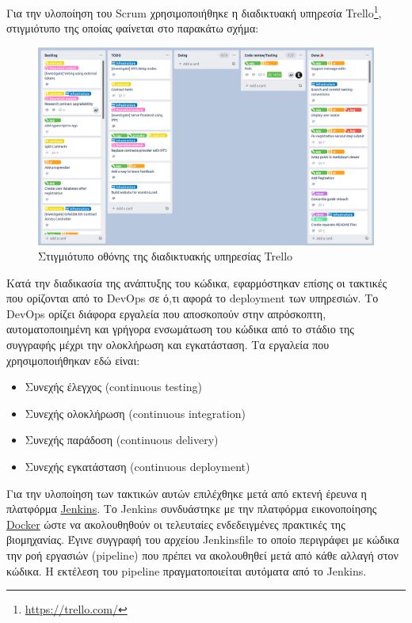 Για την υλοποίηση του Scrum χρησιμοποιήθηκε η διαδικτυακή υπηρεσία Trello\footnote{\url{https://trello.com/}}, στιγμιότυπο της οποίας φαίνεται στο παρακάτω σχήμα:

\begin{figure}[H]
    \centering
    \includegraphics[width=\textwidth]{assets/figures/chapter-4/4.1.implementation-methodology-kanban.png}
    \caption{Στιγμιότυπο οθόνης της διαδικτυακής υπηρεσίας Trello}
    \label{figure:4.1.implementation-methodology-kanban}
\end{figure}

Κατά την διαδικασία της ανάπτυξης του κώδικα, εφαρμόστηκαν επίσης οι τακτικές που ορίζονται από το DevOps σε ό,τι αφορά το deployment των υπηρεσιών. Το DevOps ορίζει διάφορα εργαλεία που αποσκοπούν στην απρόσκοπτη, αυτοματοποιημένη και γρήγορα ενσωμάτωση του κώδικα από το στάδιο της συγγραφής μέχρι την ολοκλήρωση και εγκατάσταση. Τα εργαλεία που χρησιμοποιήθηκαν εδώ είναι:

\begin{itemize}
    \item Συνεχής έλεγχος (continuous testing)
    \item Συνεχής ολοκλήρωση (continuous integration)
    \item Συνεχής παράδοση (continuous delivery)
    \item Συνεχής εγκατάσταση (continuous deployment)
\end{itemize}

Για την υλοποίηση των τακτικών αυτών επιλέχθηκε μετά από εκτενή έρευνα η πλατφόρμα \hyperref[subsection:4-2-1-3-jenkins]{Jenkins}. Το Jenkins συνδυάστηκε με την πλατφόρμα εικονοποίησης \hyperref[subsection:4-2-1-2-docker]{Docker} ώστε να ακολουθηθούν οι τελευταίες ενδεδειγμένες πρακτικές της βιομηχανίας. Έγινε συγγραφή του αρχείου Jenkinsfile το οποίο περιγράφει με κώδικα την ροή εργασιών (pipeline) που πρέπει να ακολουθηθεί μετά από κάθε αλλαγή στον κώδικα. Η εκτέλεση του pipeline πραγματοποιείται αυτόματα από το Jenkins.

